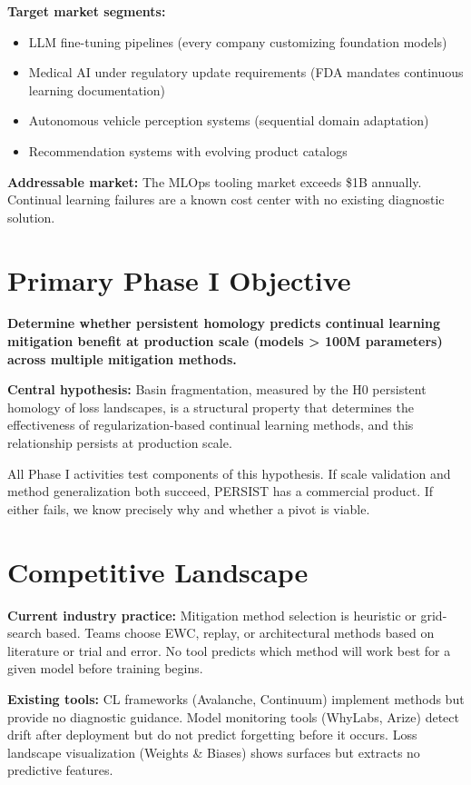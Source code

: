 \documentclass[11pt,letterpaper]{article}
\begin{document}
\textbf{Target market segments:}
\begin{itemize}[nosep]
  \item LLM fine-tuning pipelines (every company customizing foundation models)
  \item Medical AI under regulatory update requirements (FDA mandates continuous learning documentation)
  \item Autonomous vehicle perception systems (sequential domain adaptation)
  \item Recommendation systems with evolving product catalogs
\end{itemize}

\textbf{Addressable market:} The MLOps tooling market exceeds \$1B annually. Continual learning failures are a known cost center with no existing diagnostic solution.

\section{Primary Phase I Objective}

\textbf{Determine whether persistent homology predicts continual learning mitigation benefit at production scale (models > 100M parameters) across multiple mitigation methods.}

\textbf{Central hypothesis:} Basin fragmentation, measured by the H0 persistent homology of loss landscapes, is a structural property that determines the effectiveness of regularization-based continual learning methods, and this relationship persists at production scale.

All Phase I activities test components of this hypothesis. If scale validation and method generalization both succeed, PERSIST has a commercial product. If either fails, we know precisely why and whether a pivot is viable.

\section{Competitive Landscape}

\textbf{Current industry practice:} Mitigation method selection is heuristic or grid-search based. Teams choose EWC, replay, or architectural methods based on literature or trial and error. No tool predicts which method will work best for a given model before training begins.

\textbf{Existing tools:} CL frameworks (Avalanche, Continuum) implement methods but provide no diagnostic guidance. Model monitoring tools (WhyLabs, Arize) detect drift after deployment but do not predict forgetting before it occurs. Loss landscape visualization (Weights \& Biases) shows surfaces but extracts no predictive features.
\end{document}
